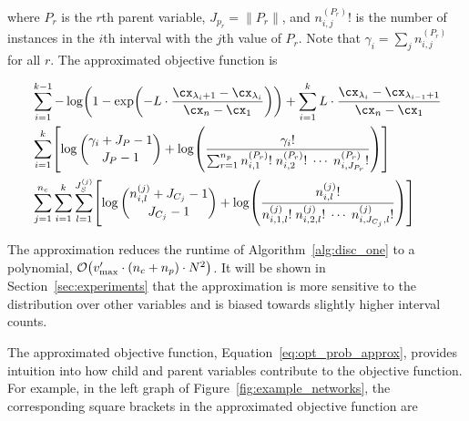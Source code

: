 \noindent
where $P_r$ is the $r$th parent variable, $J_{p_r} = \| P_r\|$, and ${n^{(P_r)}_{i,j} !}$ is the number of instances in the $i$th interval with the $j$th value of $P_r$. Note that $\gamma_i = \sum_j {n^{(P_r)}_{i,j}}$ for all $r$.
The approximated objective function is

\begin{small}
\begin{equation}
\label{eq:opt_prob_approx}
\begin{aligned}
  & \sum_{i=1}^{k-1}
   - \log
    \paren{
      1 - \exp
      \paren{
        - L \cdot  \frac{
                         \cx_{\lambda_i +1} - \cx_{\lambda_i}
                       }{
                         \cx_n - \cx_1
                        }
      }
    }
      + \sum_{i=1}^{k}
      L \cdot \frac{\cx_{\lambda_{i}} - \cx_{\lambda_{i-1} + 1}}{\cx_n - \cx_1} \\
  & \sum_{i=1}^{k} \brock{
  \log{{\gamma_i + J_P - 1}\choose{J_P - 1}}
  +{ \log \paren{
        \frac{
          {\gamma_i}!
        }{ \sum_{r=1}^{n_p}
          {n^{({P_r})}_{i,1}}! \; {n^{({P_r})}_{i,2}}! \; \cdots \; {n^{({P_r})}_{i,J_{P_r}}}!
        }
      }}
  } \\
  & \sum_{j=1}^{n_c} \sum_{i=1}^k \sum_{l=1}^{J^{(j)}_S} \brock{
  { \log
          {{n^{(j)}_{i,l} + J_{C_j} - 1}\choose{J_{C_j}-1}}}        
    +
    \log \paren{ {
          \frac{
            {n^{(j)}_{i,l}}!
          }{
            {n^{(j)}_{i,1,l}!} \; {n^{(j)}_{i,2,l}!} \; \cdots \; {n^{(j)}_{i,J_{C_j},l}!}
          }
        }        
        } }
\end{aligned}
\end{equation}
\end{small}

The approximation reduces the runtime of Algorithm~\ref{alg:disc_one} to a polynomial, $\bigo\paren{ {v'_\text{max}} \cdot (n_c + n_p) \cdot N^2}$.
It will be shown in Section~\ref{sec:experiments} that the approximation is more sensitive to the distribution over other variables and is biased towards slightly higher interval counts.

The approximated objective function, Equation~\ref{eq:opt_prob_approx}, provides intuition into how child and parent variables contribute to the objective function.
For example, in the left graph of Figure~\ref{fig:example_networks}, the corresponding square brackets in the approximated objective function are

